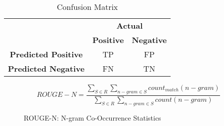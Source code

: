 \begin{table}[ht]
    \centering
    \begin{tabular}{c c c}
        \toprule
        \multirow{2}{*}{} & \multicolumn{2}{c}{\textbf{Actual}} \\
        \cmidrule(lr){2-3}
        & \textbf{Positive} & \textbf{Negative} \\
        \midrule
        \textbf{Predicted Positive} & TP & FP \\
        \textbf{Predicted Negative} & FN & TN \\
        \bottomrule
    \end{tabular}
    \caption{Confusion Matrix}
    \label{tab:confusion_matrix}
\end{table}

\begin{figure}[h]
    \centering
    \begin{equation}
        ROUGE-N = \frac{\sum_{S \in R} \sum_{n-gram \in S} count_{match}(n-gram)}{\sum_{S \in R} \sum_{n-gram \in S} count(n-gram)}\label{eq:equation}
    \end{equation}
    \caption{ROUGE-N: N-gram Co-Occurrence Statistics}
    \label{fig:rouge_formula}
\end{figure}
